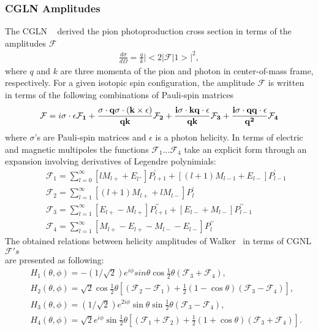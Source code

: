 \subsubsection{CGLN Amplitudes}
%
The CGLN ~\protect\cite{CGLN} derived the pion photoproduction cross section in terms of the  amplitudes $\mathcal F$ 
%
\begin{align}
\frac{d\sigma}{d\Omega} = \frac{q}{k}|<2|\mathcal F|1>|^2,
\end{align}
where $q$ and $k$ are three momenta of the pion and photon in center-of-mass frame, respectively.
%
For a given isotopic spin configuration, the amplitude $\mathcal F$ is written in terms of the following combinations of Pauli-spin matrices
%
\begin{align}
\mathcal {F} = i\bf \sigma \cdot \bf \epsilon \mathcal F_1 + \frac{\bf \sigma\cdot  q\sigma \cdot (k \times\bf  \epsilon)}{qk}\mathcal F_2+
\frac{i\bf \sigma\cdot \bf k\bf q\cdot \bf \epsilon}{qk}\mathcal F_3 + \frac{i\bf \sigma \cdot \bf q \bf q \cdot \bf \epsilon}{q^2} \mathcal F_4
\end{align}
where $\sigma$'s are Pauli-spin matrices and $\epsilon$ is a photon helicity.
%
In terms of electric and magnetic multipoles the functions $\mathcal F_1...\mathcal F_4$ take an explicit form through an expansion involving derivatives of Legendre polynimials:
%
\begin{align}
&&\mathcal F_1 = \displaystyle\sum_{l=0}^{\infty}[lM_{l+} + E_{l^+}]P_{l+1}^{\prime} + [(l+1)M_{l-1} + E_{l-}]P_{l-1}^{\prime}\\
&&\mathcal F_2 = \displaystyle\sum_{l=1}^{\infty}[(l+1)M_{l+}+lM_{l-}]P_{l}^{\prime}\\
&&\mathcal F_3 = \displaystyle\sum_{l=1}^{\infty}[E_{l+}-M_{l+}]P_{l+1}^{\prime \prime} + [E_{l-} + M_{l-}]P_{l-1}^{\prime \prime}\\
&&\mathcal F_4 = \displaystyle\sum_{l=1}^{\infty}[M_{l+} - E_{l+} - M_{l-} - E_{l-}]P_{l}^{\prime \prime}
\end{align}
%
The obtained relations between helicity amplitudes of Walker~\protect\cite{Walker} in terms of CGNL  $\mathcal F's$ \\are presented as following:
%
\begin{align}
&&H_1(\theta,\phi) = -(1/\sqrt{2})e^{i\phi}sin\theta\cos\frac{1}{2}\theta (\mathcal F_3 + \mathcal F_4),\\
&&H_2(\theta,\phi) = \sqrt{2}\cos\frac{1}{2}\theta [(\mathcal F_2 - \mathcal F_1) + \frac{1}{2}(1 - \cos\theta)(\mathcal F_3 - \mathcal F_4)],\\
&&H_3(\theta,\phi) = (1/\sqrt{2})e^{2i\phi}\sin\theta\sin\frac{1}{2}\theta(\mathcal F_3 - \mathcal F_4),\\
&&H_4(\theta,\phi) = \sqrt{2}e^{i\phi} \sin \frac{1}{2}\theta[(\mathcal F_1 + \mathcal F_2) + \frac{1}{2}(1 + \cos\theta)(\mathcal F_3 + \mathcal F_4)].
\end{align}

